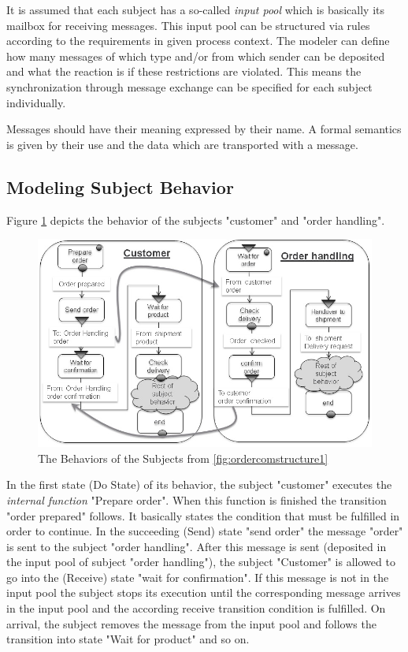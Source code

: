 It is assumed that  each subject has a so-called \textit{input pool} which is basically its mailbox for receiving messages. This input pool can be structured via rules according to the requirements in given process context. The modeler can define how many messages of which type and/or from which sender can be deposited and what the reaction is if these restrictions are violated. This means the synchronization through message exchange can be specified for each subject individually.

Messages should have their meaning expressed by their name. A formal semantics is given by their use and the data which are transported with a message. 


\subsection{Modeling Subject Behavior}

Figure \ref{fig:ordercustomerorderhandling} depicts the behavior of the subjects "customer" and "order handling".

\begin{figure}[htbp]
	\centering
	\includegraphics[width=0.9\linewidth]{Figures/Ontology/SubjectExecution/OrderCustomerOrderHandling}
	\caption[The Behaviors of the Subjects from \ref{fig:ordercomstructure1} ]{The Behaviors of the Subjects from \ref{fig:ordercomstructure1}}
	\label{fig:ordercustomerorderhandling}
\end{figure}

In the first state (Do State) of its behavior, the subject "customer" executes the \textit{internal function}  "Prepare order". When this function is finished the transition "order prepared" follows. It basically states the condition that must be fulfilled in order to continue. In the succeeding (Send) state "send order" the message "order" is sent to the subject "order handling". After this message is sent (deposited in the input pool of subject "order handling"), the subject "Customer" is allowed to go into the (Receive) state "wait for confirmation". If this message is not in the input pool the subject stops its execution until the corresponding message arrives in the input pool and the according receive transition condition is fulfilled. On arrival, the subject removes the message from the input pool and follows the transition into state "Wait for product" and so on.

